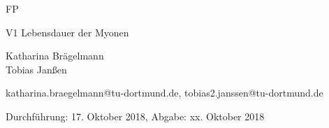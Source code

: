 \pagestyle{empty}

\begin{titlepage}



\begin{center} \large

  FP
  \vspace*{2cm}

  {\huge V1 Lebensdauer der Myonen}
  \vspace*{2.5cm}

  Katharina Brägelmann
  \\Tobias Janßen
  \vspace*{1.5cm}

  katharina.braegelmann@tu-dortmund.de, tobias2.janssen@tu-dortmund.de


  Durchführung: 17. Oktober 2018, Abgabe: xx. Oktober 2018
  \vspace*{4.5cm}


\end{center}
\end{titlepage}
